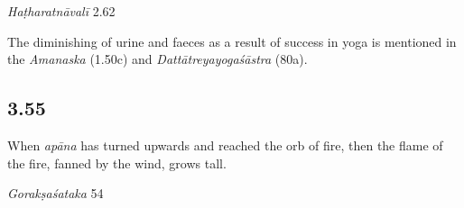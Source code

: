 \begin{ekdosis}
\begin{sources}[hp03_054]
\end{sources}

\begin{testimonia}[hp03_054]
\emph{Haṭharatnāvalī} 2.62
\begin{versinnote}
\end{versinnote}
\end{testimonia}

\begin{philcomm}[hp03_054]
The diminishing of urine and faeces as a result of success in yoga is mentioned in the \emph{Amanaska} (1.50c) and \emph{Dattātreyayogaśāstra} (80a).
\end{philcomm}

\subsection*{3.55}
\begin{translation}[hp03_055]
When \emph{apāna} has turned upwards and reached the orb of fire, then the flame of the fire, fanned by the wind, grows tall.
\end{translation}

\begin{sources}[hp03_055]
\emph{Gorakṣaśataka} 54
\begin{versinnote}
\tl{\var{54a °maṇḍalam ] \emph{from Haṭhapradīpikā witnesses}, maṇḍale \emph{codd.}}\\!}
\end{versinnote}
\end{sources}


\end{ekdosis}
